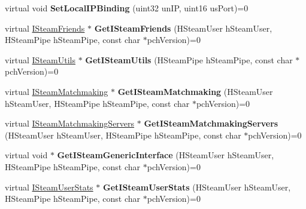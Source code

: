 \begin{DoxyCompactItemize}
\item 
\mbox{\label{class_i_steam_client_acaee3078223ff010a46fbe5bee6a7881}} 
virtual void {\bfseries Set\+Local\+I\+P\+Binding} (uint32 un\+IP, uint16 us\+Port)=0
\item 
\mbox{\label{class_i_steam_client_a1eb67def9a75c7cf14074603e4b44c7f}} 
virtual \hyperlink{class_i_steam_friends}{I\+Steam\+Friends} $\ast$ {\bfseries Get\+I\+Steam\+Friends} (H\+Steam\+User h\+Steam\+User, H\+Steam\+Pipe h\+Steam\+Pipe, const char $\ast$pch\+Version)=0
\item 
\mbox{\label{class_i_steam_client_a3c523da8128b20dddde198d356ace3d7}} 
virtual \hyperlink{class_i_steam_utils}{I\+Steam\+Utils} $\ast$ {\bfseries Get\+I\+Steam\+Utils} (H\+Steam\+Pipe h\+Steam\+Pipe, const char $\ast$pch\+Version)=0
\item 
\mbox{\label{class_i_steam_client_a8d9bed8c5c37dace44183b979787b413}} 
virtual \hyperlink{class_i_steam_matchmaking}{I\+Steam\+Matchmaking} $\ast$ {\bfseries Get\+I\+Steam\+Matchmaking} (H\+Steam\+User h\+Steam\+User, H\+Steam\+Pipe h\+Steam\+Pipe, const char $\ast$pch\+Version)=0
\item 
\mbox{\label{class_i_steam_client_a1d0ed3637f3ae4676b17e7f8c97ffd11}} 
virtual \hyperlink{class_i_steam_matchmaking_servers}{I\+Steam\+Matchmaking\+Servers} $\ast$ {\bfseries Get\+I\+Steam\+Matchmaking\+Servers} (H\+Steam\+User h\+Steam\+User, H\+Steam\+Pipe h\+Steam\+Pipe, const char $\ast$pch\+Version)=0
\item 
\mbox{\label{class_i_steam_client_aad3b43b98208df31ed17b1f25eaf851e}} 
virtual void $\ast$ {\bfseries Get\+I\+Steam\+Generic\+Interface} (H\+Steam\+User h\+Steam\+User, H\+Steam\+Pipe h\+Steam\+Pipe, const char $\ast$pch\+Version)=0
\item 
\mbox{\label{class_i_steam_client_a9de6d0cc891d7d7b197030008c2760e0}} 
virtual \hyperlink{class_i_steam_user_stats}{I\+Steam\+User\+Stats} $\ast$ {\bfseries Get\+I\+Steam\+User\+Stats} (H\+Steam\+User h\+Steam\+User, H\+Steam\+Pipe h\+Steam\+Pipe, const char $\ast$pch\+Version)=0
\item 

\end{DoxyCompactItemize}
